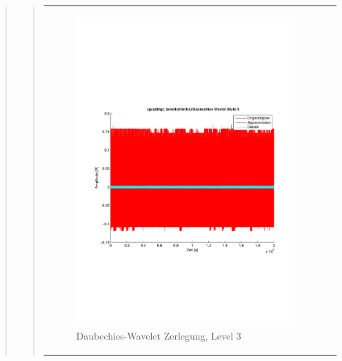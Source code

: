 \begin{quote}
\begin{quote}
\begin{center}
\begin{tabular}{ll}
\begin{minipage}{0.6\textwidth}
                    \end{minipage}
                    \begin{minipage}{0.6\textwidth}
    
                        \begin{figure}[H]
                            \label{fig:}
                            \includegraphics[scale=0.4, trim = 2cm 6cm 1cm
                            7.5cm,
                            clip]{./Bilder/Termin8/lamellenfehler_gesaettigt_Daubechies_Wavlet_lvl_3}
                            \caption{Daubechies-Wavelet Zerlegung, Level 3}
                        \end{figure}
                    \vspace{-1.5em}
    

\end{minipage}
\end{tabular}
\end{center}
\end{quote}
\end{quote}
